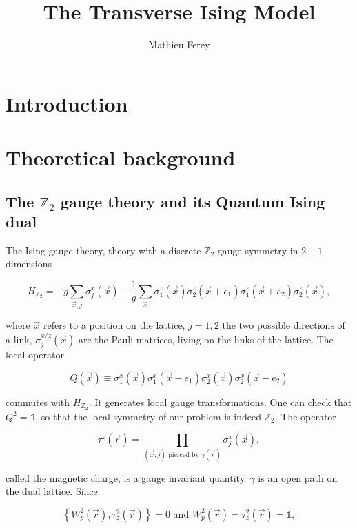 \documentclass[11pt,openany]{article}
\title{The Transverse Ising Model }
\author{Mathieu Ferey}
\begin{document}
	


\tableofcontents

\section{Introduction}

\section{Theoretical background}

\subsection{The $\mathds{Z}_2$ gauge theory and its Quantum Ising dual}

The Ising gauge theory, theory with a discrete $\mathds{Z}_2$ gauge symmetry in $2+1$-dimensions \cite{fradkin}

\begin{equation}
	H_{\mathds{Z}_2} = -g\sum_{\vec{x},j}\sigma^x_j(\vec{x}) - \frac{1}{g}\sum_{\vec{x}}\sigma_1^z(\vec{x})\sigma_2^z(\vec{x}+e_1)\sigma_1^z(\vec{x}+e_2)\sigma_2^z(\vec{x}),
\end{equation}

where $\vec{x}$ refers to a position on the lattice, $j=1,2$ the two possible directions of a link, $\sigma_j^{x/z}(\vec{x})$ are the Pauli matrices, living on the links of the lattice. The local operator

\begin{equation}
	Q(\vec{x}) \equiv \sigma_1^x(\vec{x})\sigma_1^x(\vec{x}-e_1)\sigma_2^x(\vec{x})\sigma_2^x(\vec{x}-e_2)
\end{equation}

commutes with $H_{\mathds{Z}_2}$. It generates local gauge transformations. One can check that $Q^2=\mathds{1}$, so that the local symmetry of our problem is indeed $\mathds{Z}_2$. The operator

\begin{equation}
	\tau^z(\vec{r}) = \prod_{(\vec{x},j) \text{ pierced by } \gamma(\vec{r})}\sigma_j^x(\vec{x}),
\end{equation}

called the magnetic charge, is a gauge invariant quantity. $\gamma$ is an open path on the dual lattice. Since

\begin{equation}
	\left\{W_p^2(\vec{r}),\tau_z^2(\vec{r})\right\} = 0\text{ and }W_p^2(\vec{r}) = \tau_z^2(\vec{r}) = \mathds{1},
\end{equation} 
\end{document}
